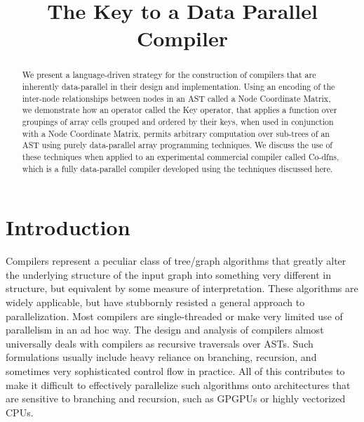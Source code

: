 \documentclass[numbers,preprint]{sigplanconf}
\begin{document}
\title{The Key to a Data Parallel Compiler}



\maketitle
\begin{abstract}
We present a language-driven strategy for the construction of 
compilers that are inherently data-parallel in their design and 
implementation. Using an encoding of the inter-node relationships 
between nodes in an AST called a Node Coordinate Matrix, we demonstrate how 
an operator called the Key operator, that applies a function over groupings 
of array cells grouped and ordered by their keys, when used in conjunction 
with a Node Coordinate Matrix, permits arbitrary computation over sub-trees 
of an AST using purely data-parallel array programming techniques. We discuss 
the use of these techniques when applied to an experimental commercial 
compiler called Co-dfns, which is a fully data-parallel compiler developed 
using the techniques discussed here.
\end{abstract}

% 
% 
% 

\section{Introduction}

Compilers represent a peculiar class of tree/graph algorithms that greatly 
alter the underlying structure of the input graph into something very 
different in structure, but equivalent by some measure of interpretation. 
These algorithms are widely applicable, but have stubbornly resisted a 
general approach to parallelization. Most compilers are single-threaded 
or make very limited use of parallelism in an ad hoc way. The design and 
analysis of compilers almost universally deals with compilers as recursive 
traversals over ASTs. Such formulations usually include heavy reliance on 
branching, recursion, and sometimes very sophisticated control flow in 
practice. All of this contributes to make it difficult to effectively 
parallelize such algorithms onto architectures that are sensitive to 
branching and recursion, such as GPGPUs or highly vectorized CPUs. 
\end{document}
